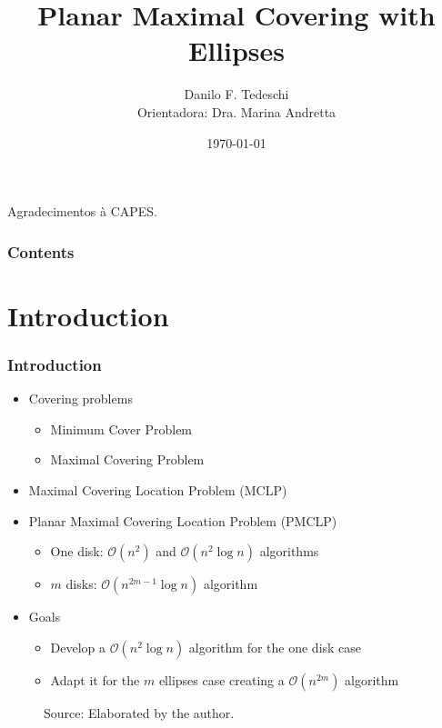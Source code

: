 \documentclass{beamer}
\title[Qualificação de Mestrado]{Planar Maximal Covering with Ellipses}
\author[Tedeschi, D. F.]{Danilo F. Tedeschi\\ \small Orientadora: Dra. Marina Andretta}
\institute[ICMC]{Instituto de Ciências Matemáticas e Computação}
\date{\today}
\newcommand{\bigO}{\mathscr{O}}
\newcommand{\source}[1]{\caption*{Source: {#1}} }
\begin{document}
\begin{frame}
 \maketitle
 
 
\centering Agradecimentos à CAPES.
\end{frame}

\begin{frame}
\frametitle{Contents}
 \tableofcontents
\end{frame}

\section{Introduction}
\begin{frame}
\frametitle{Introduction}
\begin{itemize}
	\item Covering problems
	\begin{itemize}
		\item Minimum Cover Problem
		\item Maximal Covering Problem \autocite{church:1974}
	\end{itemize}
	\item Maximal Covering Location Problem (MCLP)
	\item Planar Maximal Covering Location Problem (PMCLP)
	\begin{itemize}
	\item One disk: $\bigO(n^2)$ and $\bigO(n^2\log{n})$ algorithms
	\item $m$ disks: $\bigO(n^{2m-1}\log{n})$ algorithm
	\end{itemize}
	\item Goals
	\begin{itemize}
		\item Develop a $\bigO(n^2\log{n})$ algorithm for the one disk case
		\item Adapt it for the $m$ ellipses case creating a $\bigO(n^{2m})$ algorithm
	\end{itemize}
\end{itemize}

\end{frame} 

\begin{frame}
	\begin{figure}
		\source{Elaborated by the author.}
	\end{figure}
\end{frame}
\end{document}
